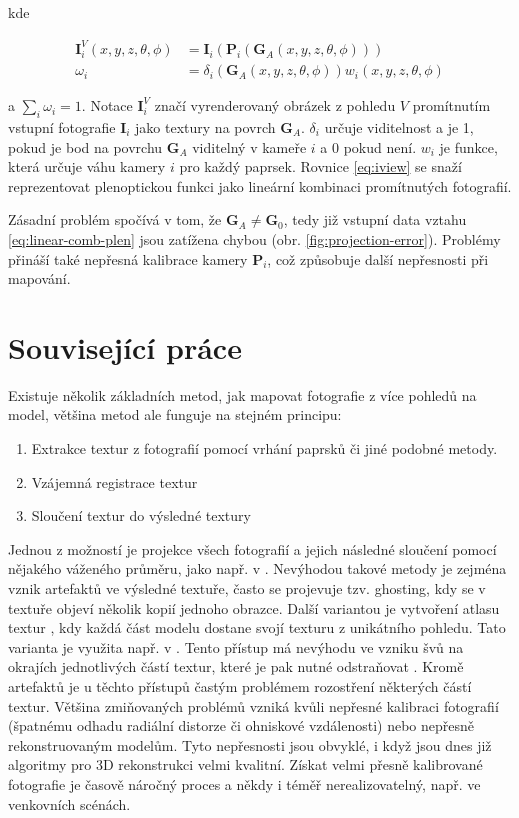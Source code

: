 \documentclass[11pt,twoside,a4paper]{book}
\begin{document}
\noindent kde

\begin{align}
\label{eq:linear-comb-plen}
\textbf{I}_{i}^{V}(x, y, z, \theta, \phi) &=\textbf{I}_{i}(\textbf{P}_{i}(\textbf{G}_A(x, y, z, \theta, \phi)))\\
\label{eq:linear-weighting}
 \omega_i &= \delta_i(\textbf{G}_A(x, y, z, \theta, \phi)) w_i(x, y, z, \theta, \phi)
\end{align}

\noindent a $\sum_i \omega_i = 1$. Notace $ \textbf{I}_{i}^{V}$ značí vyrenderovaný obrázek z pohledu $V$ promítnutím vstupní fotografie  $\textbf{I}_{i}$ jako textury na povrch  $\textbf{G}_A$. $\delta_i$ určuje viditelnost a je 1, pokud je bod na povrchu $\textbf{G}_A$ viditelný v kameře $i$ a 0 pokud není. $w_i$ je funkce, která určuje váhu kamery $i$ pro každý paprsek. Rovnice \ref{eq:iview} se snaží reprezentovat plenoptickou funkci jako lineární kombinaci promítnutých fotografií.

Zásadní problém spočívá v tom, že $\textbf{G}_A \neq \textbf{G}_0$, tedy již vstupní data vztahu \ref{eq:linear-comb-plen} jsou zatížena chybou (obr. \ref{fig:projection-error}). Problémy přináší také nepřesná kalibrace kamery $\textbf{P}_i$, což způsobuje další nepřesnosti při mapování.

\section{Související práce}
\label{sec:related}

Existuje několik základních metod, jak mapovat fotografie z více pohledů na
model, většina metod ale funguje na stejném principu:
\begin{enumerate}
\item Extrakce textur z fotografií pomocí vrhání paprsků či jiné podobné metody.
\item Vzájemná registrace textur
\item Sloučení textur do výsledné textury 
\end{enumerate}

Jednou z možností je projekce všech fotografií a jejich následné sloučení
pomocí nějakého váženého průměru, jako např. v \cite{Bernardini01}.
Nevýhodou takové metody je zejména vznik artefaktů ve výsledné textuře, často se
projevuje tzv. ghosting, kdy se v textuře objeví několik kopií jednoho obrazce.
Další variantou je vytvoření atlasu textur \cite{Allene08}, kdy každá část
modelu dostane svojí texturu z unikátního pohledu. Tato varianta je využita
např. v \cite{multi-view-tex}. Tento přístup má nevýhodu ve vzniku švů na
okrajích jednotlivých částí textur, které je pak nutné odstraňovat
\cite{seamless-mosaicing}. Kromě artefaktů je u těchto přístupů častým problémem
rozostření některých částí textur. Většina zmiňovaných problémů vzniká kvůli
nepřesné kalibraci fotografií (špatnému odhadu radiální distorze či ohniskové
vzdálenosti) nebo nepřesně rekonstruovaným modelům. Tyto nepřesnosti jsou
obvyklé, i když jsou dnes již algoritmy pro 3D rekonstrukci velmi kvalitní.
Získat velmi přesně kalibrované fotografie je časově náročný proces a někdy i
téměř nerealizovatelný, např. ve venkovních scénách.
\end{document}
